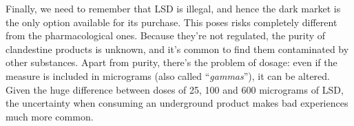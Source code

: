 Finally, we need to remember that LSD is illegal, and hence the dark market is the only option available for its purchase. This poses risks completely different from the pharmacological ones. Because they're not regulated, the purity of clandestine products is unknown, and it's common to find them contaminated by other substances. Apart from purity, there's the problem of dosage: even if the measure is included in micrograms (also called \enquote{\textit{gammas}}), it can be altered. Given the huge difference between doses of 25, 100 and 600 micrograms of LSD, the uncertainty when consuming an underground product makes bad experiences much more common.

\newpage
